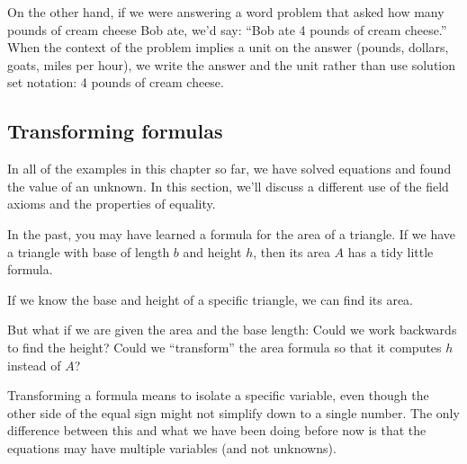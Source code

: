 On the other hand, if we were answering a word problem that asked how many pounds of cream cheese Bob ate, we'd say: ``Bob ate 4 pounds of cream cheese.'' When the context of the problem implies a unit on the answer (pounds, dollars, goats, miles per hour), we write the answer and the unit rather than use solution set notation: 4 pounds of cream cheese.

\subsection{Transforming formulas}
\label{sec:transformingformulas}

In all of the examples in this chapter so far, we have solved equations and found the value of an unknown. In this section, we'll discuss a different use of the field axioms and the properties of equality.

In the past, you may have learned a formula for the area of a triangle. If we have a triangle with base of length $b$ and height $h$, then its area $A$ has a tidy little formula.
\begin{center}
\end{center}
If we know the base and height of a specific triangle, we can find its area.
\begin{center}
\end{center}
But what if we are given the area and the base length: Could we work backwards to find the height? Could we ``transform'' the area formula so that it computes $h$ instead of $A$?

Transforming a formula means to isolate a specific variable, even though the other side of the equal sign might not simplify down to a single number. The only difference between this and what we have been doing before now is that the equations may have multiple variables (and not unknowns).

